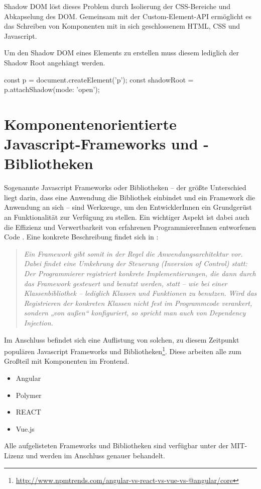 Shadow DOM löst dieses Problem durch Isolierung der CSS-Bereiche und Abkapselung des DOM. 
Gemeinsam mit der Custom-Element-API ermöglicht es das Schreiben von Komponenten mit in sich geschlossenem HTML, CSS und Javascript.


Um den Shadow DOM eines Elements zu erstellen muss diesem lediglich der Shadow Root angehängt werden.
\begin{JsCode}
	const p = document.createElement('p');
	const shadowRoot = p.attachShadow({mode: 'open'});
\end{JsCode}
\section{Komponentenorientierte Javascript-Frameworks und -Bibliotheken}
\label{cha:javascript-frameworks}
Sogenannte Javascript Frameworks oder Bibliotheken -- der größte Unterschied liegt darin, dass eine Anwendung die Bibliothek einbindet und ein Framework die Anwendung an sich -- sind Werkzeuge, um den EntwicklerInnen ein Grundgerüst an Funktionalität zur Verfügung zu stellen. Ein wichtiger Aspekt ist dabei auch die Effizienz und Verwertbarkeit von erfahrenen ProgrammiererInnen entworfenen Code \cite{js-frameworks}.
Eine konkrete Beschreibung findet sich in \cite{wiki-framework}: 
\begin{quote}\textit{Ein Framework gibt somit in der Regel die Anwendungsarchitektur vor. Dabei findet eine Umkehrung der Steuerung (Inversion of Control) statt: Der Programmierer registriert konkrete Implementierungen, die dann durch das Framework gesteuert und benutzt werden, statt -- wie bei einer Klassenbibliothek -- lediglich Klassen und Funktionen zu benutzen. Wird das Registrieren der konkreten Klassen nicht fest im Programmcode verankert, sondern „von außen“ konfiguriert, so spricht man auch von Dependency Injection.}
\end{quote}

Im Anschluss befindet sich eine Auflistung von solchen, zu diesem Zeitpunkt populären Javascript Frameworks und Bibliotheken\footnote{\url{http://www.npmtrends.com/angular-vs-react-vs-vue-vs-@angular/core}}. Diese arbeiten alle zum Großteil mit Komponenten im Frontend.
\begin{itemize}  
	\item Angular
	\item Polymer
	\item REACT
	\item Vue.js
\end{itemize}
Alle aufgelisteten Frameworks und Bibliotheken sind verfügbar unter der MIT-Lizenz und werden im Anschluss genauer behandelt.

